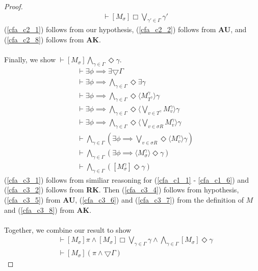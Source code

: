 \documentclass[12pt, a4paper, titlepage]{scrartcl}
\numberwithin{equation}{section}
\newcommand{\cover}{\bigtriangledown}
\newcommand{\sqex}[1]{[{#1}]}
\newcommand{\anex}[1]{\langle {#1} \rangle}
\newcommand{\axAK}{{\bf AK}}
\newcommand{\axAU}{{\bf AU}}
\newcommand{\axRK}{{\bf RK}}
\begin{document}
\begin{proof}
\begin{align}
	& \vdash \sqex{M_\sigma} \Box \bigvee_{\gamma' \in \Gamma} \gamma'\label{cfa_c2_8} 
\end{align}
(\ref{cfa_c2_1}) follows from our hypothesis, (\ref{cfa_c2_2}) follows from \axAU, and (\ref{cfa_c2_8})
	follows from \axAK.\\
\\
Finally, we show $\vdash \sqex{M_\sigma}\bigwedge_{\gamma \in \Gamma} \Diamond \gamma$.
\begin{align}
	& \vdash \exists \phi \implies \exists \cover \Gamma \label{cfa_c3_1}\\
	& \vdash \exists \phi \implies \bigwedge_{\gamma \in \Gamma} \Diamond \exists \gamma\label{cfa_c3_2}\\
	& \vdash \exists \phi \implies \bigwedge_{\gamma \in \Gamma} \Diamond \anex{
	M^\gamma_{T^{\gamma}} } \gamma\label{cfa_c3_3}\\
	& \vdash \exists \phi \implies \bigwedge_{\gamma \in \Gamma} \Diamond \anex{
	\bigvee_{v \in T^\gamma} M^\gamma_{v} } \gamma\label{cfa_c3_4}\\
	& \vdash \exists \phi \implies \bigwedge_{\gamma \in \Gamma} \Diamond \anex{
	\bigvee_{v \in \sigma R} M^\gamma_{v} } \gamma\label{cfa_c3_5}\\
	& \vdash \bigwedge_{\gamma \in \Gamma} (\exists \phi \implies \bigvee_{v \in \sigma R}
	\Diamond \anex{ M^\gamma_{v} } \gamma)\label{cfa_c3_6}\\
	& \vdash \bigwedge_{\gamma \in \Gamma} (\exists \phi \implies \anex{ M^\gamma_{\sigma}
	} \Diamond \gamma)\label{cfa_c3_7}\\
	& \vdash \bigwedge_{\gamma \in \Gamma} ([M^\gamma_{\sigma}] \Diamond \gamma)\label{cfa_c3_8}
\end{align}
(\ref{cfa_c3_1}) follows from similiar reasoning for (\ref{cfa_c1_1} - \ref{cfa_c1_6}) and
(\ref{cfa_c3_2}) follows from \axRK.
Then (\ref{cfa_c3_4}) follows from hypothesis, (\ref{cfa_c3_5}) from \axAU, (\ref{cfa_c3_6}) and
(\ref{cfa_c3_7}) from the definition of $M$ and (\ref{cfa_c3_8}) from \axAK.\\
\\
Together, we combine our result to show
\begin{align}
	& \vdash \sqex{M_\sigma} \pi \land \sqex{M_\sigma} \Box \bigvee_{\gamma \in \Gamma} \gamma \land
	\bigwedge_{\gamma \in \Gamma} \sqex{M_\sigma} \Diamond \gamma \label{cfa_cc_1} \\
	& \vdash \sqex{M_\sigma}(\pi \land \cover \Gamma) \label{cfa_cc_2}
\end{align}

\end{proof}
\end{document}
